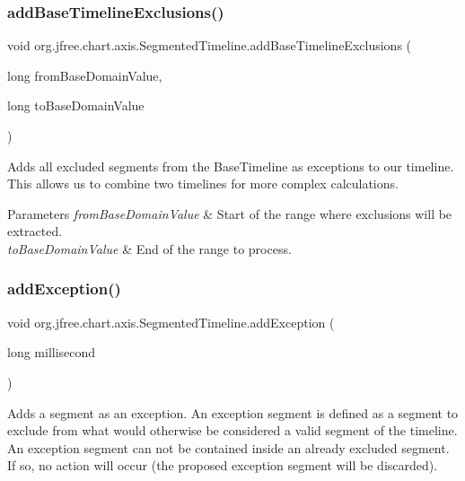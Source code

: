\subsubsection{\texorpdfstring{add\+Base\+Timeline\+Exclusions()}{addBaseTimelineExclusions()}}
{\footnotesize\ttfamily void org.\+jfree.\+chart.\+axis.\+Segmented\+Timeline.\+add\+Base\+Timeline\+Exclusions (\begin{DoxyParamCaption}\item[{long}]{from\+Base\+Domain\+Value,  }\item[{long}]{to\+Base\+Domain\+Value }\end{DoxyParamCaption})}

Adds all excluded segments from the Base\+Timeline as exceptions to our timeline. This allows us to combine two timelines for more complex calculations.


\begin{DoxyParams}{Parameters}
{\em from\+Base\+Domain\+Value} & Start of the range where exclusions will be extracted. \\
\hline
{\em to\+Base\+Domain\+Value} & End of the range to process. \\
\hline
\end{DoxyParams}
\mbox{\label{classorg_1_1jfree_1_1chart_1_1axis_1_1_segmented_timeline_a4c457d8df1c6dbdd54a298190410784c}} 
\subsubsection{\texorpdfstring{add\+Exception()}{addException()}\hspace{0.1cm}{\footnotesize\ttfamily [1/3]}}
{\footnotesize\ttfamily void org.\+jfree.\+chart.\+axis.\+Segmented\+Timeline.\+add\+Exception (\begin{DoxyParamCaption}\item[{long}]{millisecond }\end{DoxyParamCaption})}

Adds a segment as an exception. An exception segment is defined as a segment to exclude from what would otherwise be considered a valid segment of the timeline. An exception segment can not be contained inside an already excluded segment. If so, no action will occur (the proposed exception segment will be discarded). 

